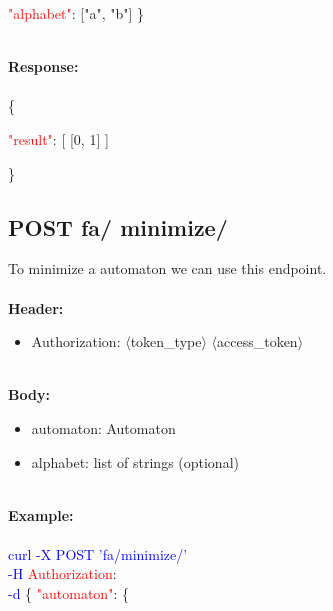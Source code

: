    \begin{adjustwidth}{7.5 mm}{0 cm}
    \textcolor{red}{"alphabet"}: ["a", "b"] \}
    \end{adjustwidth}
\ \\
\textbf{Response:}\\
\ \\
\{
\begin{adjustwidth}{7.5 mm}{0 cm}
    \textcolor{red}{"result"}: [ [0, 1] ]
\end{adjustwidth}
\}



\subsection{POST fa/ minimize/}
To minimize a automaton we can use this endpoint. \\
\ \\
\textbf{Header:}
\begin{itemize}
    \item Authorization: $\langle$token\_type$\rangle$ $\langle$access\_token$\rangle$
\end{itemize}
\ \\
\textbf{Body:}
\begin{itemize}
    \item automaton: Automaton
    \item alphabet: list of strings (optional)
\end{itemize}
\ \\
\textbf{Example:} \\
\ \\
\textcolor{blue}{curl -X POST '\BaseURL fa/minimize/'\\
-H} \textcolor{red}{Authorization}: \Auth \\
\textcolor{blue}{-d} \{ 
     \textcolor{red}{"automaton"}: \{
